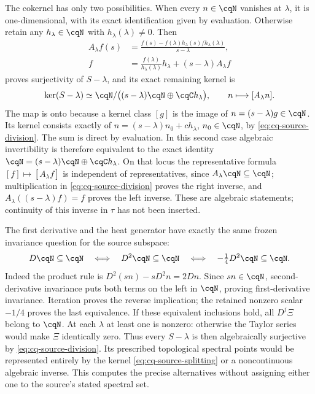 The cokernel has only two possibilities. When every $n\in\cqN$
vanishes at $\lambda$, it is one-dimensional, with its exact
identification given by evaluation. Otherwise retain any
$h_\lambda\in\cqN$ with $h_\lambda(\lambda)\ne0$. Then
\begin{equation}\label{eq:cq-source-division}
 \begin{aligned}
 A_\lambda f(s)&=
  \frac{f(s)-f(\lambda)h_\lambda(s)/h_\lambda(\lambda)}{s-\lambda},\\
 f&=\frac{f(\lambda)}{h_\lambda(\lambda)}h_\lambda
                                      +(s-\lambda)A_\lambda f
 \end{aligned}
\end{equation}
proves surjectivity of $S-\lambda$, and its exact remaining kernel is
\begin{equation}\label{eq:cq-source-splitting}
 \ker(S-\lambda)\simeq
 \cqN/\bigl((s-\lambda)\cqN\oplus\cqC h_\lambda\bigr),
 \qquad n\longmapsto[A_\lambda n].
\end{equation}
The map is onto because a kernel class $[g]$ is the image of
$n=(s-\lambda)g\in\cqN$. Its kernel consists exactly of
$n=(s-\lambda)n_0+c h_\lambda$, $n_0\in\cqN$, by
\eqref{eq:cq-source-division}. The sum is direct by evaluation.
In this second case algebraic invertibility is therefore equivalent
to the exact identity
$\cqN=(s-\lambda)\cqN\oplus\cqC h_\lambda$.
On that locus the representative formula $[f]\mapsto[A_\lambda f]$
is independent of representatives, since $A_\lambda\cqN\subseteq
\cqN$; multiplication in \eqref{eq:cq-source-division} proves the
right inverse, and $A_\lambda((s-\lambda)f)=f$ proves the left
inverse. These are algebraic statements; continuity of this inverse
in $\tau$ has not been inserted.

The first derivative and the heat generator have exactly the same
frozen invariance question for the source subspace:
\begin{equation}\label{eq:cq-source-D-equivalence}
 D\cqN\subseteq\cqN
 \quad\Longleftrightarrow\quad D^2\cqN\subseteq\cqN
 \quad\Longleftrightarrow\quad -\tfrac14D^2\cqN\subseteq\cqN.
\end{equation}
Indeed the product rule is
$D^2(sn)-sD^2n=2Dn$. Since $sn\in\cqN$, second-derivative
invariance puts both terms on the left in $\cqN$, proving
first-derivative invariance. Iteration proves the reverse implication;
the retained nonzero scalar $-1/4$ proves the last equivalence.
If these equivalent inclusions hold, all $D^j\Xi$ belong to
$\cqN$. At each $\lambda$ at least one is nonzero: otherwise
the Taylor series would make $\Xi$ identically zero. Thus every
$S-\lambda$ is then algebraically surjective by
\eqref{eq:cq-source-division}. Its prescribed topological spectral
points would be represented entirely by the kernel
\eqref{eq:cq-source-splitting} or a noncontinuous algebraic inverse.
This computes the precise alternatives without assigning either
one to the source's stated spectral set.

